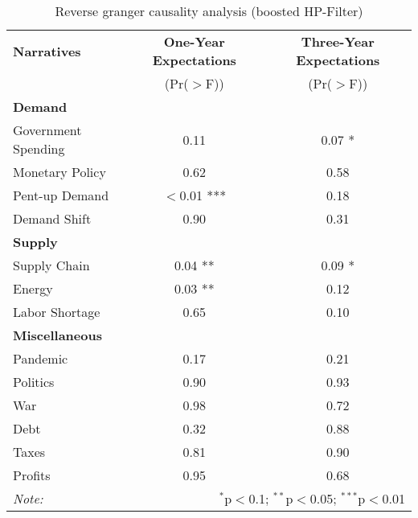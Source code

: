 \begin{table}[ht]
\centering
\caption{Reverse granger causality analysis (boosted HP-Filter)}\label{table:granger}

\begin{tabular}{lcc}
\toprule
\textbf{Narratives} & \textbf{One-Year Expectations} & \textbf{Three-Year Expectations} \\
& (Pr($>$F)) & (Pr($>$F)) \\
\midrule
\multicolumn{3}{l}{\textbf{Demand}} \\
\midrule
Government Spending & 0.11 & 0.07 * \\
Monetary Policy & 0.62 & 0.58 \\
Pent-up Demand & $<$0.01 *** & 0.18 \\
Demand Shift & 0.90 & 0.31 \\
\midrule
\multicolumn{3}{l}{\textbf{Supply}} \\
\midrule
Supply Chain & 0.04 ** & 0.09 * \\
Energy & 0.03 ** & 0.12 \\
Labor Shortage & 0.65 & 0.10 \\
\midrule
\multicolumn{3}{l}{\textbf{Miscellaneous}} \\
\midrule
Pandemic & 0.17 & 0.21 \\
Politics & 0.90 & 0.93 \\
War & 0.98 & 0.72 \\
Debt & 0.32 & 0.88 \\
Taxes & 0.81 & 0.90 \\
Profits & 0.95 & 0.68 \\
\midrule
\bottomrule
\textit{Note:}  & \multicolumn{2}{r}{$^{*}$p$<$0.1; $^{**}$p$<$0.05; $^{***}$p$<$0.01} \\
\bottomrule
\end{tabular}
\end{table}
